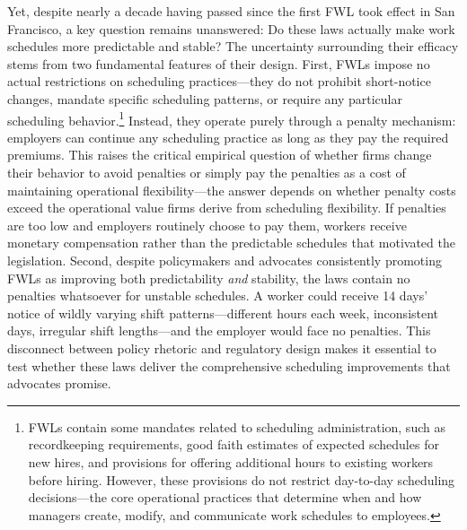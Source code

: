 \documentclass[letterpaper,11pt,leqno]{article}
\theoremstyle{paper}
\begin{document}
Yet, despite nearly a decade having passed since the first FWL took effect in San Francisco, a key question remains unanswered: Do these laws actually make work schedules more predictable and stable? The uncertainty surrounding their efficacy stems from two fundamental features of their design. First, FWLs impose no actual restrictions on scheduling practices—they do not prohibit short-notice changes, mandate specific scheduling patterns, or require any particular scheduling behavior.\footnote{FWLs contain some mandates related to scheduling administration, such as recordkeeping requirements, good faith estimates of expected schedules for new hires, and provisions for offering additional hours to existing workers before hiring. However, these provisions do not restrict day-to-day scheduling decisions—the core operational practices that determine when and how managers create, modify, and communicate work schedules to employees.} Instead, they operate purely through a penalty mechanism: employers can continue any scheduling practice as long as they pay the required premiums. This raises the critical empirical question of whether firms change their behavior to avoid penalties or simply pay the penalties as a cost of maintaining operational flexibility—the answer depends on whether penalty costs exceed the operational value firms derive from scheduling flexibility. If penalties are too low and employers routinely choose to pay them, workers receive monetary compensation rather than the predictable schedules that motivated the legislation. Second, despite policymakers and advocates consistently promoting FWLs as improving both predictability \textit{and} stability, the laws contain no penalties whatsoever for unstable schedules. A worker could receive 14 days' notice of wildly varying shift patterns—different hours each week, inconsistent days, irregular shift lengths—and the employer would face no penalties. This disconnect between policy rhetoric and regulatory design makes it essential to test whether these laws deliver the comprehensive scheduling improvements that advocates promise.
\end{document}
